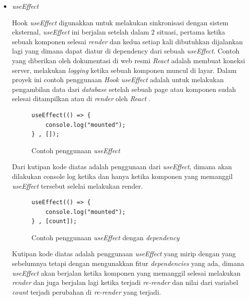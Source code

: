 \documentclass[a4paper]{article}
\begin{document}
\begin{enumerate}[label=\alph*. ]
\begin{enumerate}
\begin{itemize}
                        \item \textit{useEffect}

                        Hook \textit{useEffect} digunakkan untuk melakukan sinkronisasi dengan sistem eksternal, \textit{useEffect} ini berjalan setelah dalam 2 situasi, pertama ketika sebuah komponen selesai \textit{render} dan kedua setiap kali dibutuhkan dijalankan lagi yang dimana dapat diatur di dependency dari sebuah \textit{useEffect}. Contoh yang diberikan oleh dokumentasi di web resmi \textit{React} adalah membuat koneksi server, melakukan \textit{logging} ketika sebuah komponen muncul di layar. Dalam proyek ini contoh penggunaan \textit{Hook} \textit{useEffect} adalah untuk melakukan pengambilan data dari \textit{database} setelah sebuah page atau komponen sudah selesai ditampilkan atau di \textit{render} oleh \textit{React} \autocite{React_useEffect}.

                        \begin{figure}[h]
                            \centering
                            \begin{lstlisting}[language=HTML]
useEffect(() => {
    console.log("mounted");
} , []);
                            \end{lstlisting}
                            \caption{Contoh penggunaan \textit{useEffect}}
                        \end{figure}

                        Dari kutipan kode diatas adalah penggunaan dari \textit{useEffect}, dimana akan dilakukan console log ketika dan hanya ketika komponen yang memanggil \textit{useEffect} tersebut selelai melakukan render.

                        \begin{figure}[h]
                            \centering
                            \begin{lstlisting}[language=HTML]
useEffect(() => {
    console.log("mounted");
} , [count]);
                            \end{lstlisting}
                            \caption{Contoh penggunaan \textit{useEffect} dengan \textit{dependency}}
                        \end{figure}

                        Kutipan kode diatas adalah penggunaan \textit{useEffect} yang mirip dengan yang sebelumnya tetapi dengan mengunakkan fitur \textit{dependencies} yang ada, dimana \textit{useEffect} akan berjalan ketika komponen yang memanggil selesai melakukan \textit{render} dan juga berjalan lagi ketika terjadi \textit{re-render} dan nilai dari variabel \textit{count} terjadi perubahan di \textit{re-render} yang terjadi.


\end{itemize}
\end{enumerate}
\end{enumerate}
\end{document}
